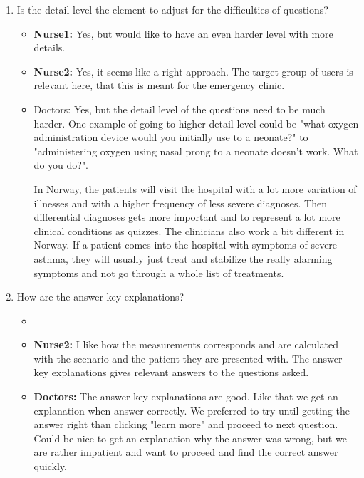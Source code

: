 \begin{enumerate}
\begin{itemize}
	\end{itemize}
	\item Is the detail level the element to adjust for the difficulties of questions?
	\begin{itemize}
		\item \textbf{Nurse1:} Yes, but would like to have an even harder level with more details.
		\item \textbf{Nurse2:} Yes, it seems like a right approach. The target group of users is relevant here, that this is meant for the emergency clinic.
		\item {Doctors:} Yes, but the detail level of the questions need to be much harder. One example of going to higher detail level could be "what oxygen administration device would you initially use to a neonate?" to "administering oxygen using nasal prong to a neonate doesn't work. What do you do?". 
		
		In Norway, the patients will visit the hospital with a lot more variation of illnesses and with a higher frequency of less severe diagnoses. Then differential diagnoses gets more important and to represent a lot more clinical conditions as quizzes. The clinicians also work a bit different in Norway. If a patient comes into the hospital with symptoms of severe asthma, they will usually just treat and stabilize the really alarming symptoms and not go through a whole list of treatments.
	\end{itemize}
	\item How are the answer key explanations?
	\begin{itemize}
		\item 
		\item \textbf{Nurse2:} I like how the measurements corresponds and are calculated with the scenario and the patient they are presented with. The answer key explanations gives relevant answers to the questions asked.
		\item \textbf{Doctors:} The answer key explanations are good. Like that we get an explanation when answer correctly. We preferred to try until getting the answer right than clicking "learn more" and proceed to next question. Could be nice to get an explanation why the answer was wrong, but we are rather impatient and want to proceed and find the correct answer quickly.
	\end{itemize}
\end{enumerate}

